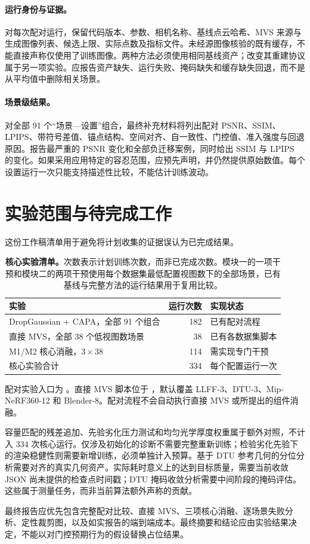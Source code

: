 \documentclass{article}
\newcommand{\ours}{CAPA}
\begin{document}
\paragraph{运行身份与证据。}
对每次配对运行，保留代码版本、参数、相机名称、基线点云哈希、MVS 来源与生成图像列表、候选上限、实际点数及指标文件。未经源图像核验的既有缓存，不能直接声称仅使用了训练图像。两种方法必须使用相同基线资产；改变其重建协议属于另一项实验。应报告资产缺失、运行失败、掩码缺失和缓存缺失回退，而不是从平均值中删除相关场景。

\paragraph{场景级结果。}
对全部 91 个“场景—设置”组合，最终补充材料将列出配对 PSNR、SSIM、LPIPS、带符号差值、锚点结构、空间对齐、自一致性、门控值、准入强度与回退原因。报告最严重的 PSNR 变化和全部负迁移案例，同时给出 SSIM 与 LPIPS 的变化。如果采用应用特定的容忍范围，应预先声明，并仍然提供原始数值。每个设置运行一次只能支持描述性比较，不能估计训练波动。

\section{实验范围与待完成工作}
\label{app:execution}

这份工作稿清单用于避免将计划收集的证据误认为已完成结果。

\begin{table}[ht]
\caption{\textbf{核心实验清单。}次数表示计划训练次数，而非已完成次数。模块一的一项干预和模块二的两项干预使用每个数据集最低配置视图数下的全部场景，已有基线与完整方法的运行结果用于复用比较。}
\centering\small
\setlength{\tabcolsep}{4pt}
\begin{tabular}{@{}lrl@{}}
\toprule
实验 & 运行次数 & 实现状态\\
\midrule
DropGaussian + \ours{}，全部 91 个组合 & 182 & 已有配对流程\\
直接 MVS，全部 38 个低视图数场景 & 38 & 已有各数据集脚本\\
M1/M2 核心消融，$3\times38$ & 114 & 需实现专门干预\\
\midrule
核心实验合计 & 334 & 每个配置运行一次\\
\bottomrule
\end{tabular}
\end{table}

配对实验入口为 。直接 MVS 脚本位于 ，默认覆盖 LLFF-3、DTU-3、Mip-NeRF360-12 和 Blender-8。配对流程不会自动执行直接 MVS 或所提出的组件消融。

容量匹配的残差追加、先验劣化压力测试和均匀光学厚度权重属于额外对照，不计入 334 次核心运行。仅涉及初始化的诊断不需要完整重新训练；检验劣化先验下的渲染稳健性则需要新增训练，必须单独计入预算。基于 DTU 参考几何的分位分析需要对齐的真实几何资产。实际耗时意义上的达到目标质量，需要当前收敛 JSON 尚未提供的检查点时间戳；DTU 掩码收敛分析需要中间阶段的掩码评估。这些属于测量任务，而非当前算法额外声称的贡献。

最终报告应优先包含完整配对比较、直接 MVS、三项核心消融、逐场景失败分析、定性裁剪图，以及如实报告的端到端成本。最终摘要和结论应由实验结果决定，不能以对门控预期行为的假设替换占位结果。
\end{document}
